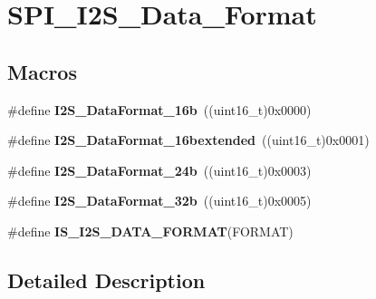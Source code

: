 \hypertarget{group___s_p_i___i2_s___data___format}{\section{S\-P\-I\-\_\-\-I2\-S\-\_\-\-Data\-\_\-\-Format}
\label{group___s_p_i___i2_s___data___format}
}
\subsection*{Macros}
\begin{DoxyCompactItemize}
\item 
\hypertarget{group___s_p_i___i2_s___data___format_gabcd7cb799b68346a735709cc135bd414}{\#define {\bfseries I2\-S\-\_\-\-Data\-Format\-\_\-16b}~((uint16\-\_\-t)0x0000)}\label{group___s_p_i___i2_s___data___format_gabcd7cb799b68346a735709cc135bd414}

\item 
\hypertarget{group___s_p_i___i2_s___data___format_gae44b9704c9e393d5abec9bf4fcfe1116}{\#define {\bfseries I2\-S\-\_\-\-Data\-Format\-\_\-16bextended}~((uint16\-\_\-t)0x0001)}\label{group___s_p_i___i2_s___data___format_gae44b9704c9e393d5abec9bf4fcfe1116}

\item 
\hypertarget{group___s_p_i___i2_s___data___format_ga5a959486671cf00c5a734f1df205581b}{\#define {\bfseries I2\-S\-\_\-\-Data\-Format\-\_\-24b}~((uint16\-\_\-t)0x0003)}\label{group___s_p_i___i2_s___data___format_ga5a959486671cf00c5a734f1df205581b}

\item 
\hypertarget{group___s_p_i___i2_s___data___format_ga6be3bdcc713cb92a9ad247de013a5e37}{\#define {\bfseries I2\-S\-\_\-\-Data\-Format\-\_\-32b}~((uint16\-\_\-t)0x0005)}\label{group___s_p_i___i2_s___data___format_ga6be3bdcc713cb92a9ad247de013a5e37}

\item 
\#define {\bfseries I\-S\-\_\-\-I2\-S\-\_\-\-D\-A\-T\-A\-\_\-\-F\-O\-R\-M\-A\-T}(F\-O\-R\-M\-A\-T)
\end{DoxyCompactItemize}


\subsection{Detailed Description}


